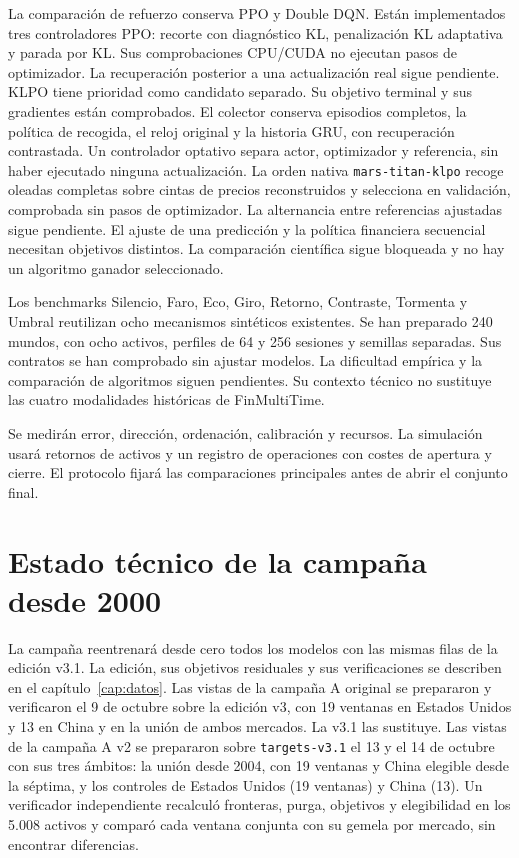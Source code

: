 \documentclass[11pt,a4paper]{report}
\begin{document}
La comparación de refuerzo conserva PPO y Double DQN. Están implementados tres
controladores PPO: recorte con diagnóstico KL, penalización KL adaptativa y
parada por KL. Sus comprobaciones CPU/CUDA no ejecutan pasos de optimizador.
La recuperación posterior a una actualización real sigue pendiente. KLPO tiene
prioridad como candidato separado. Su objetivo terminal y sus gradientes están
comprobados. El colector conserva episodios completos, la política de recogida,
el reloj original y la historia GRU, con recuperación contrastada. Un
controlador optativo separa actor, optimizador y referencia, sin haber
ejecutado ninguna actualización. La orden nativa \texttt{mars-titan-klpo}
recoge oleadas completas sobre cintas de precios reconstruidos y selecciona en
validación, comprobada sin pasos de optimizador. La alternancia entre referencias ajustadas
sigue pendiente.
El ajuste de una predicción y la política financiera secuencial necesitan
objetivos distintos. La comparación científica sigue bloqueada y no hay un
algoritmo ganador seleccionado.

Los benchmarks Silencio, Faro, Eco, Giro, Retorno, Contraste, Tormenta y Umbral
reutilizan ocho mecanismos sintéticos existentes. Se han preparado 240 mundos,
con ocho activos, perfiles de 64 y 256 sesiones y semillas separadas. Sus contratos
se han comprobado sin ajustar modelos. La dificultad empírica y la comparación
de algoritmos siguen pendientes. Su contexto técnico no sustituye las cuatro
modalidades históricas de FinMultiTime.

Se medirán error, dirección, ordenación, calibración y recursos. La simulación usará
retornos de activos y un registro de operaciones con costes de apertura y cierre.
El protocolo fijará las comparaciones principales antes de abrir el conjunto final.

\section{Estado técnico de la campaña desde 2000}
La campaña reentrenará desde cero todos los modelos con las mismas filas de la
edición v3.1. La edición, sus objetivos residuales y sus verificaciones se
describen en el capítulo~\ref{cap:datos}. Las vistas de la campaña A original
se prepararon y verificaron el 9 de octubre sobre la edición v3, con 19
ventanas en Estados Unidos y 13 en China y en la unión de ambos mercados. La
v3.1 las sustituye. Las vistas de la campaña A v2 se prepararon sobre
\texttt{targets-v3.1} el 13 y el 14 de octubre con sus tres ámbitos: la unión
desde 2004, con 19 ventanas y China elegible desde la séptima, y los controles
de Estados Unidos (19 ventanas) y China (13). Un verificador independiente
recalculó fronteras, purga, objetivos y elegibilidad en los 5.008 activos y
comparó cada ventana conjunta con su gemela por mercado, sin encontrar
diferencias.
\end{document}
